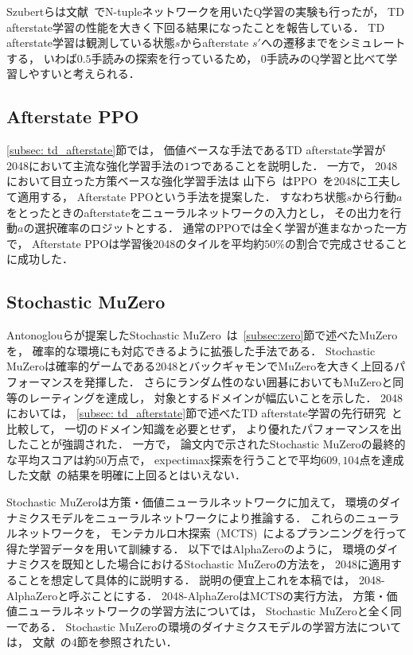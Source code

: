 Szubertらは文献~\cite{Szubert}でN-tupleネットワークを用いたQ学習の実験も行ったが， TD afterstate学習の性能を大きく下回る結果になったことを報告している．
TD afterstate学習は観測している状態$s$からafterstate $s'$への遷移までをシミュレートする， いわば$0.5$手読みの探索を行っているため， $0$手読みのQ学習と比べて学習しやすいと考えられる．

\subsection{Afterstate PPO}
\ref{subsec: td_afterstate}節では， 価値ベースな手法であるTD afterstate学習が2048において主流な強化学習手法の$1$つであることを説明した．
一方で， 2048において目立った方策ベースな強化学習手法は
山下ら~\cite{afterstate_ppo}はPPO~\cite{PPO}を2048に工夫して適用する， Afterstate PPOという手法を提案した．
すなわち状態$s$から行動$a$をとったときのafterstateをニューラルネットワークの入力とし， その出力を行動$a$の選択確率のロジットとする．
通常のPPOでは全く学習が進まなかった一方で， Afterstate PPOは学習後2048のタイルを平均約$50\%$の割合で完成させることに成功した．

\subsection{Stochastic MuZero}
\label{subsec: stochastic_muzero}
Antonoglouらが提案したStochastic MuZero~\cite{StochasticMuZero}は~\ref{subsec:zero}節で述べたMuZeroを， 確率的な環境にも対応できるように拡張した手法である．
Stochastic MuZeroは確率的ゲームである2048とバックギャモンでMuZeroを大きく上回るパフォーマンスを発揮した．
さらにランダム性のない囲碁においてもMuZeroと同等のレーティングを達成し， 対象とするドメインが幅広いことを示した．
2048においては， \ref{subsec: td_afterstate}節で述べたTD afterstate学習の先行研究~\cite{DBLP:journals/corr/Jaskowski16}と比較して， 一切のドメイン知識を必要とせず， より優れたパフォーマンスを出したことが強調された．
一方で， 論文内で示されたStochastic MuZeroの最終的な平均スコアは約$50$万点で， expectimax探索を行うことで平均$609,104$点を達成した文献~\cite{DBLP:journals/corr/Jaskowski16}の結果を明確に上回るとはいえない．

Stochastic MuZeroは方策・価値ニューラルネットワークに加えて， 環境のダイナミクスモデルをニューラルネットワークにより推論する．
これらのニューラルネットワークを， モンテカルロ木探索~(MCTS)~によるプランニングを行って得た学習データを用いて訓練する．
以下ではAlphaZeroのように， 環境のダイナミクスを既知とした場合におけるStochastic MuZeroの方法を， 2048に適用することを想定して具体的に説明する．
説明の便宜上これを本稿では， 2048-AlphaZeroと呼ぶことにする．
2048-AlphaZeroはMCTSの実行方法， 方策・価値ニューラルネットワークの学習方法については， Stochastic MuZeroと全く同一である．
Stochastic MuZeroの環境のダイナミクスモデルの学習方法については， 文献~\cite{StochasticMuZero}の$4$節を参照されたい．

